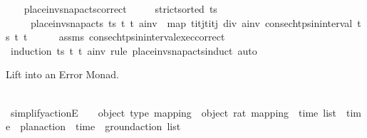 \begin{isabellebody}
\isanewline
\ \ \isamarkupfalse%
\ place{\isacharunderscore}{\kern0pt}inv{\isacharunderscore}{\kern0pt}snap{\isacharunderscore}{\kern0pt}acts{\isacharunderscore}{\kern0pt}correct{\isacharcolon}{\kern0pt}\isanewline
\ \ \ \ \ {\isachardoublequoteopen}strict{\isacharunderscore}{\kern0pt}sorted\ ts{\isachardoublequoteclose}\isanewline
\ \ \ \ \ {\isachardoublequoteopen}place{\isacharunderscore}{\kern0pt}inv{\isacharunderscore}{\kern0pt}snap{\isacharunderscore}{\kern0pt}acts\ ts\ t\ t\ a\isactrlsub i\isactrlsub n\isactrlsub v\ {\isacharequal}{\kern0pt}\ map\ {\isacharparenleft}{\kern0pt}{\isasymlambda}{\isacharparenleft}{\kern0pt}t\isactrlsub i{\isacharcomma}{\kern0pt}t\isactrlsub j{\isacharparenright}{\kern0pt}{\isachardot}{\kern0pt}{\isacharparenleft}{\kern0pt}{\isacharparenleft}{\kern0pt}t\isactrlsub i{\isacharplus}{\kern0pt}t\isactrlsub j{\isacharparenright}{\kern0pt}\ div\ {}{\isacharcomma}{\kern0pt}a\isactrlsub i\isactrlsub n\isactrlsub v{\isacharparenright}{\kern0pt}{\isacharparenright}{\kern0pt}\ {\isacharparenleft}{\kern0pt}consec{\isacharunderscore}{\kern0pt}htps{\isacharunderscore}{\kern0pt}in{\isacharunderscore}{\kern0pt}interval\ ts\ t\ t\isanewline
%
\isadelimproof
\ \ \ \ %
\endisadelimproof
%
\isatagproof
{}\isamarkupfalse%
\ assms\ consec{\isacharunderscore}{\kern0pt}htps{\isacharunderscore}{\kern0pt}in{\isacharunderscore}{\kern0pt}interval{\isacharunderscore}{\kern0pt}exec{\isacharunderscore}{\kern0pt}correct\isanewline
\ \ \ \ \isamarkupfalse%
\ {\isacharparenleft}{\kern0pt}induction\ ts\ t\ t\ a\isactrlsub i\isactrlsub n\isactrlsub v\ rule{\isacharcolon}{\kern0pt}\ place{\isacharunderscore}{\kern0pt}inv{\isacharunderscore}{\kern0pt}snap{\isacharunderscore}{\kern0pt}acts{\isachardot}{\kern0pt}induct{\isacharparenright}{\kern0pt}\ auto%
\endisatagproof
{\isafoldproof}%
%
\isadelimproof
%
\endisadelimproof
%
\begin{isamarkuptext}%
Lift  into an Error Monad.%
\end{isamarkuptext}\isamarkuptrue%
\ \ \isamarkupfalse%
\ simplify{\isacharunderscore}{\kern0pt}actionE\ {\isacharcolon}{\kern0pt}{\isacharcolon}{\kern0pt}\ {\isachardoublequoteopen}{\isacharunderscore}{\kern0pt}\ {\isasymRightarrow}\ {\isacharparenleft}{\kern0pt}object{\isacharcomma}{\kern0pt}\ type{\isacharparenright}{\kern0pt}\ mapping\ {\isasymRightarrow}\ {\isacharparenleft}{\kern0pt}object{\isacharcomma}{\kern0pt}\ rat{\isacharparenright}{\kern0pt}\ mapping\ {\isasymRightarrow}\ time\ list\ {\isasymRightarrow}\ {\isacharparenleft}{\kern0pt}time\ {\isasymtimes}\ plan{\isacharunderscore}{\kern0pt}action{\isacharparenright}{\kern0pt}\ {\isasymRightarrow}\ {\isacharunderscore}{\kern0pt}{\isacharplus}{\kern0pt}{\isacharparenleft}{\kern0pt}time\ {\isasymtimes}\ ground{\isacharunderscore}{\kern0pt}action{\isacharparenright}{\kern0pt}\ list{\isachardoublequoteclose}\ \isanewline

\end{isabellebody}
